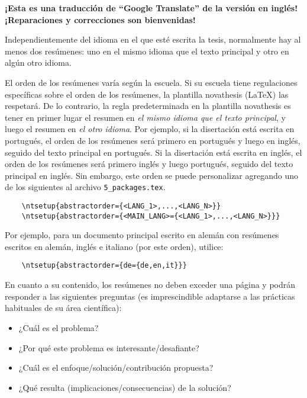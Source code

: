 
%


\textbf{¡Esta es una traducción de “Google Translate” de la versión en inglés! ¡Reparaciones y correcciones son bienvenidas!}

Independientemente del idioma en el que esté escrita la tesis, normalmente hay al menos dos resúmenes: uno en el mismo idioma que el texto principal y otro en algún otro idioma.

El orden de los resúmenes varía según la escuela. Si su escuela tiene regulaciones específicas sobre el orden de los resúmenes, la plantilla \gls{novathesis} (\LaTeX) las respetará. De lo contrario, la regla predeterminada en la plantilla \gls{novathesis} es tener en primer lugar el resumen en \emph{el mismo idioma que el texto principal}, y luego el resumen en \emph{el otro idioma}. Por ejemplo, si la disertación está escrita en portugués, el orden de los resúmenes será primero en portugués y luego en inglés, seguido del texto principal en portugués. Si la disertación está escrita en inglés, el orden de los resúmenes será primero inglés y luego portugués, seguido del texto principal en inglés.
%
Sin embargo, este orden se puede personalizar agregando uno de los siguientes al archivo \verb+5_packages.tex+.
%

\begin{verbatim}
    \ntsetup{abstractorder={<LANG_1>,...,<LANG_N>}}
    \ntsetup{abstractorder={<MAIN_LANG>={<LANG_1>,...,<LANG_N>}}}
\end{verbatim}

Por ejemplo, para un documento principal escrito en alemán con resúmenes escritos en alemán, inglés e italiano (por este orden), utilice:
\begin{verbatim}
    \ntsetup{abstractorder={de={de,en,it}}}
\end{verbatim}

En cuanto a su contenido, los resúmenes no deben exceder una página y podrán responder a las siguientes preguntas (es imprescindible adaptarse a las prácticas habituales de su área científica):

\begin{itemize}
  \item ¿Cuál es el problema?
  \item ¿Por qué este problema es interesante/desafiante?
  \item ¿Cuál es el enfoque/solución/contribución propuesta?
  \item ¿Qué resulta (implicaciones/consecuencias) de la solución?
\end{itemize}

